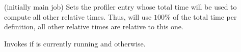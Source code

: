 \begin{command}{\pgfprofilesetrel{} (initially main job)}
    Sets the profiler entry whose total time will be used to compute all other
    relative times. Thus,  will use $100\%$ of the
    total time per definition, all other relative times are relative to this
    one.
\end{command}

\begin{command}{\pgfprofileifisrunning{}}
    Invokes  if  is currently running
    and  otherwise.
\end{command}
